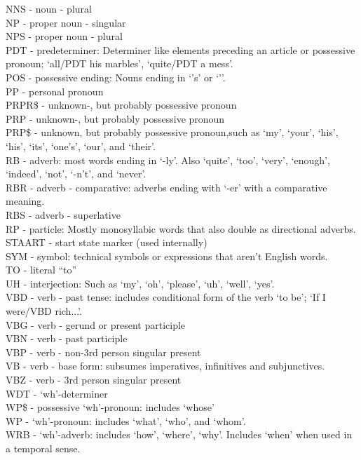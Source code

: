 NNS - noun - plural\\
NP - proper noun - singular\\
NPS - proper noun - plural\\
PDT - predeterminer: Determiner like elements preceding an article or possessive pronoun; `all/PDT his marbles', `quite/PDT a mess'.\\
POS - possessive ending: Nouns ending in `'s' or `'{}'.\\
PP - personal pronoun\\
PRPR\$ - unknown-, but probably possessive pronoun\\
PRP - unknown-, but probably possessive pronoun\\
PRP\$ - unknown, but probably possessive pronoun,such as `my', `your', `his', `his', `its', `one's', `our', and `their'.\\
RB - adverb: most words ending in `-ly'. Also `quite', `too', `very', `enough', `indeed', `not', `-n't', and `never'.\\
RBR - adverb - comparative: adverbs ending with `-er' with a comparative meaning.\\
RBS - adverb - superlative\\
RP - particle: Mostly monosyllabic words that also double as directional adverbs.\\
STAART - start state marker (used internally)\\
SYM - symbol: technical symbols or expressions that aren't English words.\\
TO - literal ``to''\\
UH - interjection: Such as `my', `oh', `please', `uh', `well', `yes'.\\
VBD - verb - past tense: includes conditional form of the verb `to be'; `If I were/VBD rich...'.\\
VBG - verb - gerund or present participle\\
VBN - verb - past participle\\
VBP - verb - non-3rd person singular present\\
VB - verb - base form: subsumes imperatives, infinitives and subjunctives.\\
VBZ - verb - 3rd person singular present\\
WDT - `wh'-determiner\\
WP\$ - possessive `wh'-pronoun: includes `whose'\\
WP - `wh'-pronoun: includes `what', `who', and `whom'.\\
WRB - `wh'-adverb: includes `how', `where', `why'. Includes `when' when used in a temporal sense.\\
